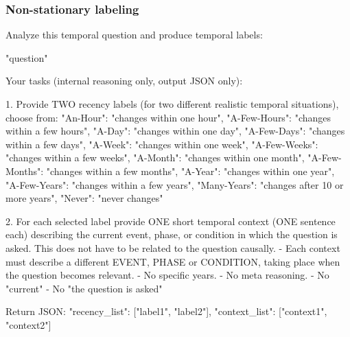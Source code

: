 \subsubsection{Non-stationary labeling}\label{prompt:label-nonstat}
\begin{promptblock}
Analyze this temporal question and produce temporal labels:

"{question}"

Your tasks (internal reasoning only, output JSON only):

1. Provide TWO recency labels (for two different realistic temporal situations), choose from:
{
  "An-Hour": "changes within one hour",
  "A-Few-Hours": "changes within a few hours",
  "A-Day": "changes within one day",
  "A-Few-Days": "changes within a few days",
  "A-Week": "changes within one week",
  "A-Few-Weeks": "changes within a few weeks",
  "A-Month": "changes within one month",
  "A-Few-Months": "changes within a few months",
  "A-Year": "changes within one year",
  "A-Few-Years": "changes within a few years",
  "Many-Years": "changes after 10 or more years",
  "Never": "never changes"
}

2. For each selected label provide ONE short temporal context (ONE sentence each) describing the current event, phase, or condition in which the question is asked. This does not have to be related to the question causally.
  - Each context must describe a different EVENT, PHASE or CONDITION, taking place when the question becomes relevant.
   - No specific years.
   - No meta reasoning.
   - No "current"
   - No "the question is asked"

Return JSON:
{
  "recency_list": ["label1", "label2"],
  "context_list": ["context1", "context2"]
}
\end{promptblock}

